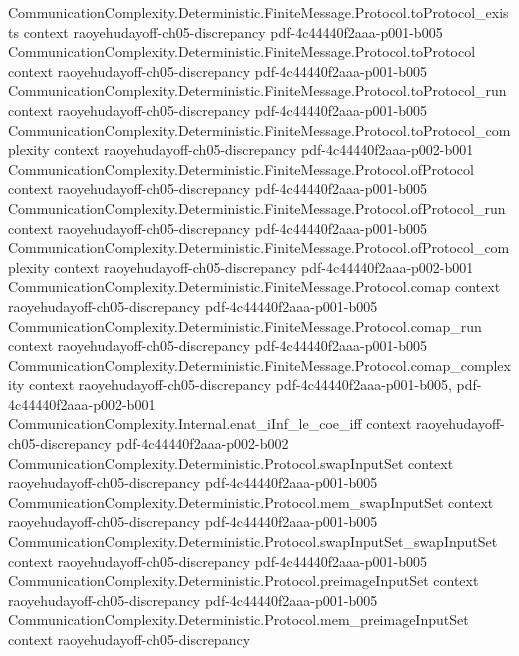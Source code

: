 \begin{lemma}
\proofstep
  {CommunicationComplexity.Deterministic.FiniteMessage.Protocol.toProtocol_exists}
  {context}
  {raoyehudayoff-ch05-discrepancy}
  {pdf-4c44440f2aaa-p001-b005}
\proofstep
  {CommunicationComplexity.Deterministic.FiniteMessage.Protocol.toProtocol}
  {context}
  {raoyehudayoff-ch05-discrepancy}
  {pdf-4c44440f2aaa-p001-b005}
\proofstep
  {CommunicationComplexity.Deterministic.FiniteMessage.Protocol.toProtocol_run}
  {context}
  {raoyehudayoff-ch05-discrepancy}
  {pdf-4c44440f2aaa-p001-b005}
\proofstep
  {CommunicationComplexity.Deterministic.FiniteMessage.Protocol.toProtocol_complexity}
  {context}
  {raoyehudayoff-ch05-discrepancy}
  {pdf-4c44440f2aaa-p002-b001}
\proofstep
  {CommunicationComplexity.Deterministic.FiniteMessage.Protocol.ofProtocol}
  {context}
  {raoyehudayoff-ch05-discrepancy}
  {pdf-4c44440f2aaa-p001-b005}
\proofstep
  {CommunicationComplexity.Deterministic.FiniteMessage.Protocol.ofProtocol_run}
  {context}
  {raoyehudayoff-ch05-discrepancy}
  {pdf-4c44440f2aaa-p001-b005}
\proofstep
  {CommunicationComplexity.Deterministic.FiniteMessage.Protocol.ofProtocol_complexity}
  {context}
  {raoyehudayoff-ch05-discrepancy}
  {pdf-4c44440f2aaa-p002-b001}
\proofstep
  {CommunicationComplexity.Deterministic.FiniteMessage.Protocol.comap}
  {context}
  {raoyehudayoff-ch05-discrepancy}
  {pdf-4c44440f2aaa-p001-b005}
\proofstep
  {CommunicationComplexity.Deterministic.FiniteMessage.Protocol.comap_run}
  {context}
  {raoyehudayoff-ch05-discrepancy}
  {pdf-4c44440f2aaa-p001-b005}
\proofstep
  {CommunicationComplexity.Deterministic.FiniteMessage.Protocol.comap_complexity}
  {context}
  {raoyehudayoff-ch05-discrepancy}
  {pdf-4c44440f2aaa-p001-b005,
    pdf-4c44440f2aaa-p002-b001}
\proofstep
  {CommunicationComplexity.Internal.enat_iInf_le_coe_iff}
  {context}
  {raoyehudayoff-ch05-discrepancy}
  {pdf-4c44440f2aaa-p002-b002}
\proofstep
  {CommunicationComplexity.Deterministic.Protocol.swapInputSet}
  {context}
  {raoyehudayoff-ch05-discrepancy}
  {pdf-4c44440f2aaa-p001-b005}
\proofstep
  {CommunicationComplexity.Deterministic.Protocol.mem_swapInputSet}
  {context}
  {raoyehudayoff-ch05-discrepancy}
  {pdf-4c44440f2aaa-p001-b005}
\proofstep
  {CommunicationComplexity.Deterministic.Protocol.swapInputSet_swapInputSet}
  {context}
  {raoyehudayoff-ch05-discrepancy}
  {pdf-4c44440f2aaa-p001-b005}
\proofstep
  {CommunicationComplexity.Deterministic.Protocol.preimageInputSet}
  {context}
  {raoyehudayoff-ch05-discrepancy}
  {pdf-4c44440f2aaa-p001-b005}
\proofstep
  {CommunicationComplexity.Deterministic.Protocol.mem_preimageInputSet}
  {context}
  {raoyehudayoff-ch05-discrepancy}

\end{lemma}
